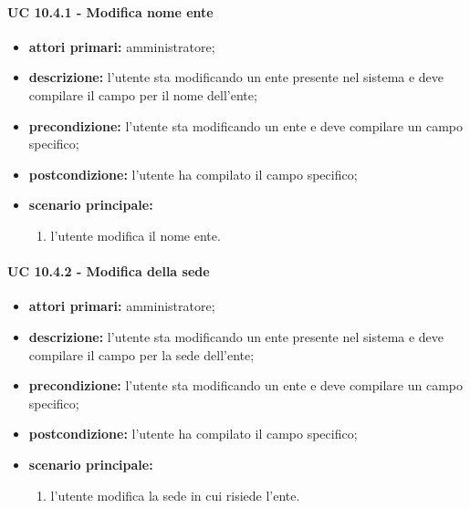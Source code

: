 				\paragraph{UC 10.4.1 - Modifica nome ente}
				\begin{itemize}
					\item \textbf{attori primari:} amministratore;
					\item \textbf{descrizione:} l'utente sta modificando un ente presente nel sistema e deve compilare il campo per il nome dell'ente;
					\item \textbf{precondizione:} l'utente sta modificando un ente e deve compilare un campo specifico;
					\item \textbf{postcondizione:} l'utente ha compilato il campo specifico;
					\item \textbf{scenario principale:}
					\begin{enumerate}
						\item l'utente modifica il nome ente.
					\end{enumerate}
				\end{itemize}

				\paragraph{UC 10.4.2 - Modifica della sede}
				\begin{itemize}
					\item \textbf{attori primari:} amministratore;
					\item \textbf{descrizione:} l'utente sta modificando un ente presente nel sistema e deve compilare il campo per la sede dell'ente;
					\item \textbf{precondizione:} l'utente sta modificando un ente e deve compilare un campo specifico;
					\item \textbf{postcondizione:} l'utente ha compilato il campo specifico;
					\item \textbf{scenario principale:}
					\begin{enumerate}
						\item l'utente modifica la sede in cui risiede l'ente.
					\end{enumerate}
				\end{itemize}


